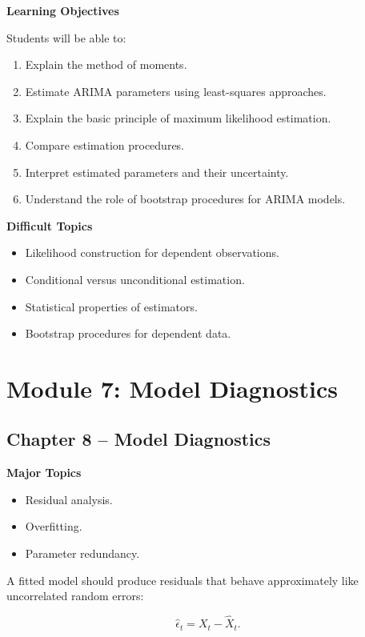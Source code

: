 \documentclass[11pt,a4paper]{article}
\begin{document}
\textbf{Learning Objectives}

Students will be able to:

\begin{enumerate}
    \item Explain the method of moments.
    \item Estimate ARIMA parameters using least-squares approaches.
    \item Explain the basic principle of maximum likelihood estimation.
    \item Compare estimation procedures.
    \item Interpret estimated parameters and their uncertainty.
    \item Understand the role of bootstrap procedures for ARIMA models.
\end{enumerate}

\textbf{Difficult Topics}

\begin{itemize}
    \item Likelihood construction for dependent observations.
    \item Conditional versus unconditional estimation.
    \item Statistical properties of estimators.
    \item Bootstrap procedures for dependent data.
\end{itemize}

\section{Module 7: Model Diagnostics}

\subsection{Chapter 8 -- Model Diagnostics}

\textbf{Major Topics}

\begin{itemize}
    \item Residual analysis.
    \item Overfitting.
    \item Parameter redundancy.
\end{itemize}

A fitted model should produce residuals that behave approximately like
uncorrelated random errors:

\[
\hat{\epsilon}_t
=
X_t-\hat X_t.
\]
\end{document}
